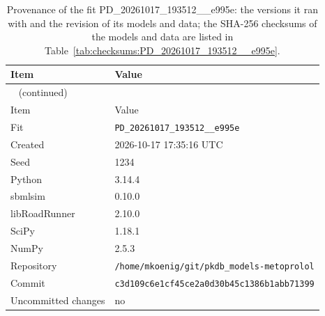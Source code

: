 \begin{longtable}{ll}
\caption{Provenance of the fit PD\_20261017\_193512\_\_e995e: the versions it ran with and the revision of its models and data; the SHA-256 checksums of the models and data are listed in Table~\ref{tab:checksums:PD_20261017_193512__e995e}.}\label{tab:provenance:PD_20261017_193512__e995e} \\
\toprule
Item & Value \\
\midrule
\endfirsthead
\multicolumn{2}{l}{\small\tablename~\thetable{} (continued)} \\
\toprule
Item & Value \\
\midrule
\endhead
\bottomrule
\endlastfoot
Fit & \texttt{PD\_20261017\_193512\_\_e995e} \\
Created & 2026-10-17 17:35:16 UTC \\
Seed & 1234 \\
Python & 3.14.4 \\
sbmlsim & 0.10.0 \\
libRoadRunner & 2.10.0 \\
SciPy & 1.18.1 \\
NumPy & 2.5.3 \\
Repository & \texttt{/home/mkoenig/git/pkdb\_models-metoprolol} \\
Commit & \texttt{c3d109c6e1cf45ce2a0d30b45c1386b1abb71399} \\
Uncommitted changes & no \\
\end{longtable}



